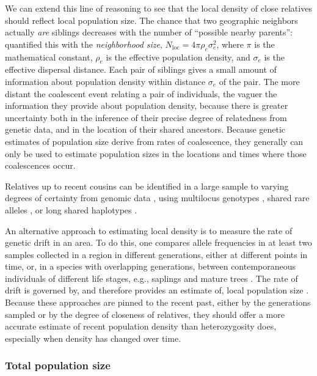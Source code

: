 \documentclass{ar-1col}
\renewcommand{\emph}[1]{{\textit{#1}}}
\begin{document}
We can extend this line of reasoning to see that 
the local density of close relatives
should reflect local population size.
The chance that two geographic neighbors actually \emph{are} siblings 
decreases with the number of ``possible nearby parents'':
\citet{wright1946isolation} quantified this with the
\emph{neighborhood size}, 
$N_\text{loc} = 4 \pi \rho_e \sigma_e^2$,
where $\pi$ is the mathematical constant,
$\rho_e$ is the effective population density,
and $\sigma_e$ is the effective dispersal distance.
Each pair of siblings gives a small amount of information
about population density within distance $\sigma_e$ of the pair.
The more distant the coalescent event relating a pair of individuals, 
the vaguer the information they provide about population density,
because there is greater uncertainty 
both in the inference of their precise degree of relatedness from genetic data,
and in the location of their shared ancestors.
Because genetic estimates of population size 
derive from rates of coalescence,
they generally can only be used to estimate population sizes 
in the locations and times where those coalescences occur.

Relatives up to recent cousins can be identified in a large sample to varying degrees of certainty 
from genomic data \citep[reviewed in][]{Wang2016Prediction},
using multilocus genotypes \citep{nomura2008estimation,WaplesWaples2011,Wang_2014},
shared rare alleles \citep{NovembreSlatkin2009}, 
or long shared haplotypes \citep[e.g.,][]{li2014relationship}.

An alternative approach to estimating local density
is to measure the rate of genetic drift in an area.
To do this, one compares allele frequencies
in at least two samples collected in a region in different generations, 
either at different points in time,
or, in a species with overlapping generations, 
between contemporaneous individuals of different life stages, 
e.g., saplings and mature trees
\citep{WilliamsonSlatkin1999}.
The rate of drift is governed by, 
and therefore provides an estimate of, 
local population size
\citep[analogous to \emph{variance effective size} of a population][]{ewens2004mpg,Charlesworth2009}.
Because these approaches are pinned to the recent past, 
either by the generations sampled or by the degree of closeness of relatives,
they should offer a more accurate estimate of recent population density than heterozygosity does, 
especially when density has changed over time.

\subsubsection{Total population size}
\end{document}
